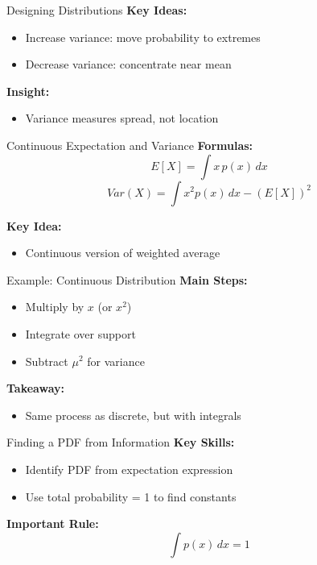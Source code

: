 \documentclass[dvipsnames]{beamer}
\begin{document}

\begin{frame}{Designing Distributions}
\textbf{Key Ideas:}
\begin{itemize}
    \item Increase variance: move probability to extremes
    \item Decrease variance: concentrate near mean
\end{itemize}

\textbf{Insight:}
\begin{itemize}
    \item Variance measures spread, not location
\end{itemize}
\end{frame}


\begin{frame}{Continuous Expectation and Variance}
\textbf{Formulas:}
\[
E[X] = \int x\,p(x)\,dx
\]
\[
Var(X) = \int x^2 p(x)\,dx - (E[X])^2
\]

\textbf{Key Idea:}
\begin{itemize}
    \item Continuous version of weighted average
\end{itemize}
\end{frame}


\begin{frame}{Example: Continuous Distribution}
\textbf{Main Steps:}
\begin{itemize}
    \item Multiply by $x$ (or $x^2$)
    \item Integrate over support
    \item Subtract $\mu^2$ for variance
\end{itemize}

\textbf{Takeaway:}
\begin{itemize}
    \item Same process as discrete, but with integrals
\end{itemize}
\end{frame}


\begin{frame}{Finding a PDF from Information}
\textbf{Key Skills:}
\begin{itemize}
    \item Identify PDF from expectation expression
    \item Use total probability = 1 to find constants
\end{itemize}

\textbf{Important Rule:}
\[
\int p(x)\,dx = 1
\]
\end{frame}
\end{document}
